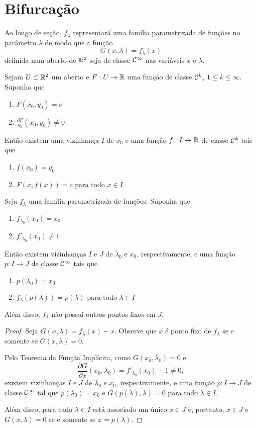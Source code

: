 \section{Bifurcação}

Ao longo de seção, $f_\lambda$ representará uma família parametrizada de funções no parâmetro $\lambda$ de modo que a função
$$G(x, \lambda) = f_\lambda(x)$$
definida num aberto de $\mathbb{R}^2$ seja de classe $\mathcal{C}^\infty$ nas variáveis $x$ e $\lambda$.

\begin{theorem}
Sejam $U \subset \mathbb{R}^2$ um aberto e $F: U \to \mathbb{R}$ uma função de classe $\mathcal{C}^k$, $1 \leq k \leq \infty$. Suponha que
\begin{enumerate}
\item $F(x_0, y_0) = c$
\item $\frac{\partial F}{\partial y} (x_0, y_0) \neq 0$
\end{enumerate} 
Então existem uma vizinhança $I$ de $x_0$ e uma função $f: I \to \mathbb{R}$ de classe $\mathcal{C}^k$ tais que
\begin{enumerate}
\item $f(x_0) = y_0$
\item $F(x, f(x)) = c$ para todo $x \in I$
\end{enumerate}
\end{theorem}

\begin{theorem}
\label{theorem1}
Seja $f_\lambda$ uma família parametrizada de funções. Suponha que \begin{enumerate}
\item $f_{\lambda_0}(x_0) = x_0$
\item $f'_{\lambda_0}(x_0) \neq 1$ 
\end{enumerate}
Então existem vizinhanças $I$ e $J$ de $\lambda_0$ e $x_0$, respectivamente, e uma função $p: I \to J$ de classe $\mathcal{C}^\infty$ tais que
\begin{enumerate}
\item $p(\lambda_0) = x_0$ 
\item $f_\lambda(p(\lambda)) = p(\lambda)$ para todo $\lambda \in I$
\end{enumerate}
Além disso, $f_\lambda$ não possui outros pontos fixos em $J$.
\end{theorem}

\begin{proof}
Seja $G(x, \lambda) = f_\lambda(x) - x$. Observe que $x$ é ponto fixo de $f_\lambda$ se e somente se $G(x, \lambda) = 0$.

Pelo Teorema da Função Implícita, como $G(x_0, \lambda_0) = 0$ e
$$\frac{\partial G}{\partial x} (x_0, \lambda_0) = f'_{\lambda_0}(x_0) - 1 \neq 0,$$
existem vizinhanças $I$ e $J$ de $\lambda_0$ e $x_0$, respectivamente, e uma função $p: I \to J$ de classe $\mathcal{C}^\infty$ tal que $p(\lambda_0) = x_0$ e $G(p(\lambda), \lambda) = 0$ para todo $\lambda \in I$.

Além disso, para cada $\lambda \in I$ está associado um único $x \in J$ e, portanto, $x \in J$ e $G(x, \lambda) = 0$ se e somente se $x = p(\lambda)$.
\end{proof}

